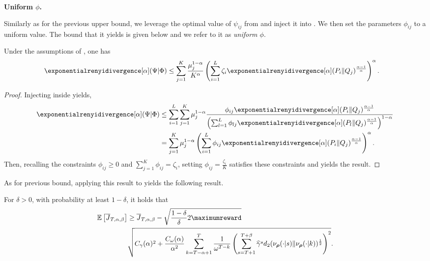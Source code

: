 \textbf{Uniform $\phi$.}

Similarly as for the previous upper bound, we leverage the optimal value of $\psi_{ij}$ from  and inject it into . We then set the parameters $\phi_{ij}$ to a uniform value. 
The bound that it yields is given below and we refer to it as \textit{uniform $\phi$}. 

\begin{prop}
Under the assumptions of , one has
    \begin{align*}
        \exponentialrenyidivergence[\alpha](\Psi\vert\Phi)
        &\leq \sum_{j=1}^K \frac{\mu_j^{1-\alpha}}{K^{\alpha}}  \left(\sum_{i=1}^L \zeta_i \exponentialrenyidivergence[\alpha](P_i \Vert Q_j)^{\frac{\alpha-1}{\alpha}}
        \right)^{\alpha}.
    \end{align*}
\end{prop}
\begin{proof}
    Injecting  inside  yields,
    \begin{align*}
        \exponentialrenyidivergence[\alpha](\Psi\vert\Phi)
        &\leq \sum_{i=1}^L\sum_{j=1}^K \mu_j^{1-\alpha} \frac{\phi_{ij}\exponentialrenyidivergence[\alpha](P_i \Vert Q_j)^{\frac{\alpha-1}{\alpha}}}{\left(\sum_{l=1}^L \phi_{lj}\exponentialrenyidivergence[\alpha](P_l \Vert Q_j)^{\frac{\alpha-1}{\alpha}}\right)^{1-\alpha}}
        \\
        &= \sum_{j=1}^K \mu_j^{1-\alpha} \left(\sum_{i=1}^L \phi_{ij}\exponentialrenyidivergence[\alpha](P_i \Vert Q_j)^{\frac{\alpha-1}{\alpha}}
        \right)^{\alpha}.
    \end{align*}
    Then, recalling the constraints $\phi_{ij}\geq 0$ and $\textstyle\sum_{j=1}^K \phi_{ij}=\zeta_i$, setting $\textstyle\phi_{ij}=\frac{\zeta_i}{K}$ satisfies these constraints and yields the result.
\end{proof}
    
As for previous bound, applying this result to  yields the following result.
    
\begin{prop}
    For $\delta>0$, with probability at least $1-\delta$, it holds that 
    \begin{align*}
        \mathbb{E}\left[\overline{J}_{T,\alpha,\beta} \right] 
        &\geq  \overline{J}_{T,\alpha,\beta} - 
        \sqrt{
            \frac{1-\delta}{\delta} 2 \maximumreward  }
        \\
        &\sqrt{
            C_\gamma(\alpha)^2 +
            \frac{C_\omega(\alpha)}{\alpha^2}
            \sum_{k=T-\alpha+1}^T \frac{1}{\omega^{T-k}} \left(\sum_{s=T+1}^{T+\beta}\widehat{\gamma}^s d_2(\nu_{\boldsymbol\rho}(\cdot\vert s)\Vert \nu_{\boldsymbol\rho}(\cdot\vert k))^{\frac{1}{2}}
            \right)^{2}
        }.
    \end{align*}
\end{prop}




